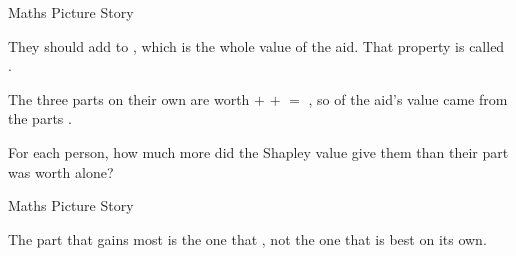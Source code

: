 \newpage
{}

\vspace{1cm}

\begin{center}
{\Large Maths  \hspace{1.8cm}
 Picture  \hspace{1.8cm}
 Story }
\end{center}

\vspace{1.4cm}

{\large They should add to , which is the whole
value of the aid. That property is called .}

\vspace{1.4cm}

{\large The three parts on their own are worth  $+$
 $+$  $=$
, so  of the aid's value
came from the parts .}

\newpage
{}

\vspace{0.8cm}

{\large For each person, how much more did the Shapley value give them than
their part was worth alone?}

\vspace{0.8cm}

\begin{center}
{\Large Maths  \hspace{1.8cm}
 Picture  \hspace{1.8cm}
 Story }
\end{center}

\vspace{1.2cm}

{\large The part that gains most is the one that
, not the one that is best on its own.}


\newpage
{}

\vspace{0.5cm}

